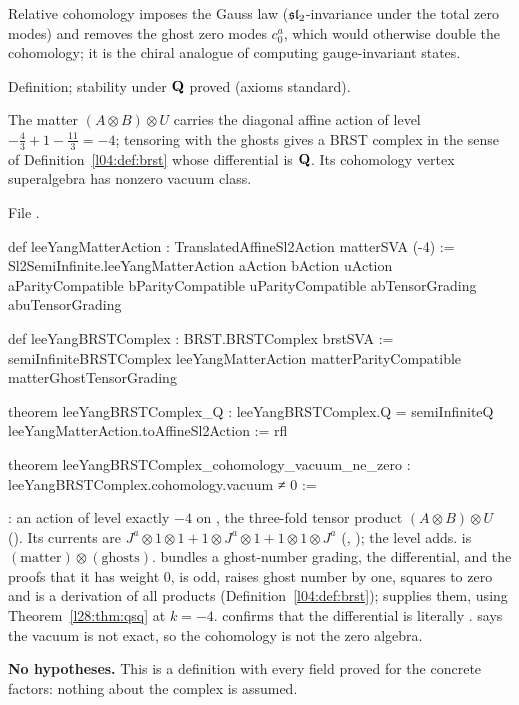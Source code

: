 \begin{physics}
Relative cohomology imposes the Gauss law ($\mathfrak{sl}_2$-invariance under the total zero modes) and removes the ghost zero modes
$c^a_0$, which would otherwise double the cohomology; it is the chiral analogue of computing gauge-invariant states.
\end{physics}

\begin{status}
Definition; stability under $\mathbf Q$ proved (axioms standard).
\end{status}

\begin{theorem}\label{l28:thm:complex}
The matter $(A\otimes B)\otimes U$ carries the diagonal affine action of level $-\tfrac43+1-\tfrac{11}3=-4$; tensoring with the ghosts
gives a BRST complex in the sense of Definition~\ref{l04:def:brst} whose differential is $\mathbf Q$. Its cohomology vertex
superalgebra has nonzero vacuum class.
\end{theorem}

\noindent File .
\begin{leancode}
def leeYangMatterAction : TranslatedAffineSl2Action matterSVA (-4) :=
  Sl2SemiInfinite.leeYangMatterAction aAction bAction uAction
    aParityCompatible bParityCompatible uParityCompatible abTensorGrading abuTensorGrading

def leeYangBRSTComplex : BRST.BRSTComplex brstSVA :=
  semiInfiniteBRSTComplex leeYangMatterAction matterParityCompatible matterGhostTensorGrading

theorem leeYangBRSTComplex_Q :
    leeYangBRSTComplex.Q = semiInfiniteQ leeYangMatterAction.toAffineSl2Action := rfl

theorem leeYangBRSTComplex_cohomology_vacuum_ne_zero :
    leeYangBRSTComplex.cohomology.vacuum ≠ 0 :=
\end{leancode}

\begin{dictionary}
: an action of level exactly $-4$ on , the three-fold tensor product
$(A\otimes B)\otimes U$ (). Its currents are $J^a\otimes1\otimes1+1\otimes J^a\otimes1+1\otimes1\otimes J^a$
(, ); the level adds.  is
$(\text{matter})\otimes(\text{ghosts})$.  bundles a ghost-number grading, the differential, and the
proofs that it has weight $0$, is odd, raises ghost number by one, squares to zero and is a derivation of all products
(Definition~\ref{l04:def:brst});  supplies them, using Theorem~\ref{l28:thm:qsq} at $k=-4$.
 confirms that the differential is literally .  says the
vacuum is not exact, so the cohomology is not the zero algebra.

\textbf{No hypotheses.} This is a definition with every field proved for the concrete factors: nothing about the complex is assumed.
\end{dictionary}

